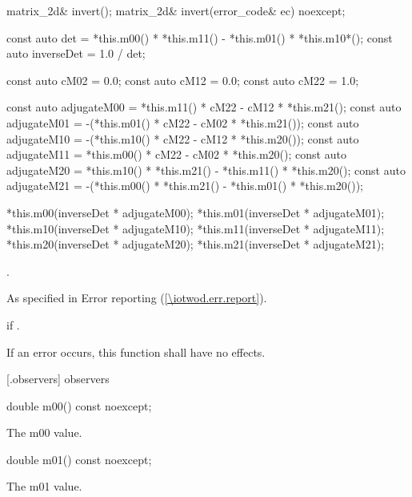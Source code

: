 \begin{itemdecl}
matrix_2d& invert();
matrix_2d& invert(error_code& ec) noexcept;
\end{itemdecl}
\begin{itemdescr}
	\pnum
	\effects
\begin{codeblock}
const auto det = *this.m00() * *this.m11() - *this.m01() * *this.m10*();
const auto inverseDet = 1.0 / det;

const auto cM02 = 0.0;
const auto cM12 = 0.0;
const auto cM22 = 1.0;

const auto adjugateM00 =   *this.m11() * cM22 - cM12 * *this.m21();
const auto adjugateM01 = -(*this.m01() * cM22 - cM02 * *this.m21());
const auto adjugateM10 = -(*this.m10() * cM22 - cM12 * *this.m20());
const auto adjugateM11 =   *this.m00() * cM22 - cM02 * *this.m20();
const auto adjugateM20 =   *this.m10() * *this.m21() - *this.m11() * 
  *this.m20();
const auto adjugateM21 = -(*this.m00() * *this.m21() - *this.m01() * 
  *this.m20());

*this.m00(inverseDet * adjugateM00);
*this.m01(inverseDet * adjugateM01);
*this.m10(inverseDet * adjugateM10);
*this.m11(inverseDet * adjugateM11);
*this.m20(inverseDet * adjugateM20);
*this.m21(inverseDet * adjugateM21);
\end{codeblock}
	
	\pnum
	\returns
	.
	
	\pnum
	\throws
	As specified in Error reporting (\ref{\iotwod.err.report}).
	
	\pnum
	\errors
	 if .
	
	\pnum
	\remark
	If an error occurs, this function shall have no effects.
	
\end{itemdescr}

 [\matrixtwod.observers] { observers}

\begin{itemdecl}
	double m00() const noexcept;
\end{itemdecl}
\begin{itemdescr}
	\pnum
	\returns
	The m00 value.
\end{itemdescr}

\begin{itemdecl}
	double m01() const noexcept;
\end{itemdecl}
\begin{itemdescr}
	\pnum
	\returns
	The m01 value.
\end{itemdescr}

